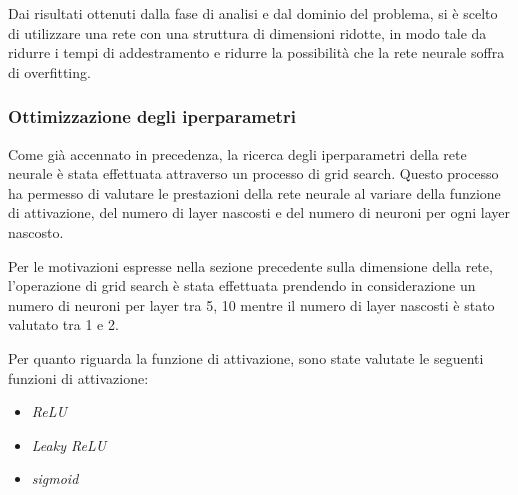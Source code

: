 Dai risultati ottenuti dalla fase di analisi e dal dominio del problema, si è
scelto di utilizzare una rete con una struttura di dimensioni ridotte, in modo
tale da ridurre i tempi di addestramento e ridurre la possibilità che la rete
neurale soffra di overfitting.

\subsubsection{Ottimizzazione degli iperparametri}
Come già accennato in precedenza, la ricerca degli iperparametri della rete neurale
è stata effettuata attraverso un processo di grid search. Questo processo ha
permesso di valutare le prestazioni della rete neurale al variare della funzione
di attivazione, del numero di layer nascosti e del numero di neuroni per ogni
layer nascosto.

Per le motivazioni espresse nella sezione precedente sulla dimensione della rete,
l'operazione di grid search è
stata effettuata prendendo in considerazione un numero di neuroni per layer
tra 5, 10 mentre il numero di layer nascosti è stato valutato tra 1 e 2.

Per quanto riguarda la funzione di attivazione, sono state valutate le seguenti
funzioni di attivazione:
\begin{itemize}
    \item \textit{ReLU}
    \item \textit{Leaky ReLU}
    \item \textit{sigmoid}
\end{itemize}

